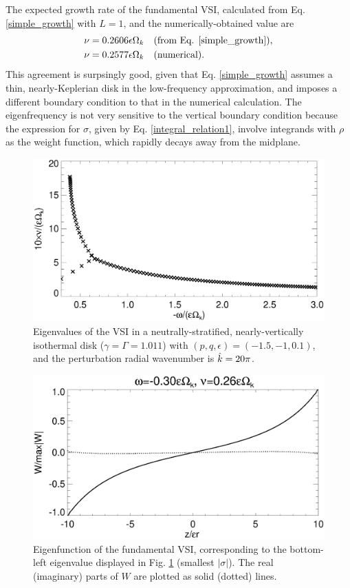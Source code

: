 The expected growth rate of the fundamental VSI, calculated from
Eq. \ref{simple_growth} with $L=1$, and the numerically-obtained value
are  
\begin{align*}
  \nu = 0.2606\epsilon\Omega_k &\quad \text{(from
    Eq. \ref{simple_growth})},\\
  \nu = 0.2577 \epsilon \Omega_k &\quad \text{(numerical)}.
\end{align*}
This agreement is surpsingly good, given that
Eq. \ref{simple_growth} assumes a thin, nearly-Keplerian disk in the 
low-frequency approximation, and
imposes a different boundary condition to that in the numerical
calculation. The eigenfrequency is not very sensitive to the vertical boundary
condition because the expression for $\sigma$, given by
Eq. \ref{integral_relation1}, involve integrands with $\rho$ as the 
weight function, which rapidly decays away from the midplane.

\begin{figure}
  \includegraphics[width=\linewidth]{figures/eigenvalues_iso}
  \caption{Eigenvalues of the VSI in a neutrally-stratified,
    nearly-vertically isothermal disk  ($\gamma=\Gamma=1.011$) with 
    $(p,q,\epsilon)=(-1.5,-1,0.1)$, and the perturbation radial
    wavenumber is $\hat{k}=20\pi$. \label{lowfreq_eigen}
  }
\end{figure}

\begin{figure}
  \includegraphics[width=\linewidth]{figures/eigenvector_iso}
  \caption{Eigenfunction of the fundamental VSI,
    corresponding to the bottom-left eigenvalue displayed in
    Fig. \ref{lowfreq_eigen} (smallest $|\sigma|$). The real
    (imaginary) parts of $W$ are plotted as solid (dotted) lines. 
    \label{lowfreq_eigenfunc}
  }
\end{figure}

